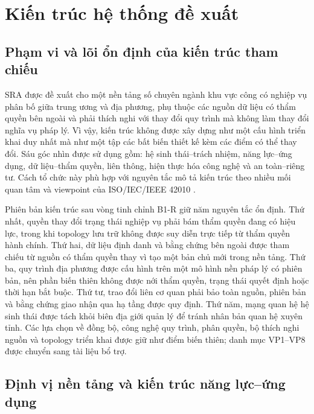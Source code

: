 \section{Kiến trúc hệ thống đề xuất}
\label{sec:arch}

\subsection{Phạm vi và lõi ổn định của kiến trúc tham chiếu}
\label{subsec:scope-viewpoints}

SRA được đề xuất cho một nền tảng số chuyên ngành khu vực công có nghiệp vụ phân bố giữa trung ương và địa phương, phụ thuộc các nguồn dữ liệu có thẩm quyền bên ngoài và phải thích nghi với thay đổi quy trình mà không làm thay đổi nghĩa vụ pháp lý. Vì vậy, kiến trúc không được xây dựng như một cấu hình triển khai duy nhất mà như một tập các bất biến thiết kế kèm các điểm có thể thay đổi. Sáu góc nhìn được sử dụng gồm: hệ sinh thái--trách nhiệm, năng lực--ứng dụng, dữ liệu--thẩm quyền, liên thông, hiện thực hóa công nghệ và an toàn--riêng tư. Cách tổ chức này phù hợp với nguyên tắc mô tả kiến trúc theo nhiều mối quan tâm và viewpoint của ISO/IEC/IEEE 42010 \citep{iso42010_2022}.

Phiên bản kiến trúc sau vòng tinh chỉnh B1-R giữ năm nguyên tắc ổn định. Thứ nhất, quyền thay đổi trạng thái nghiệp vụ phải bám thẩm quyền đang có hiệu lực, trong khi topology lưu trữ không được suy diễn trực tiếp từ thẩm quyền hành chính. Thứ hai, dữ liệu định danh và bằng chứng bên ngoài được tham chiếu từ nguồn có thẩm quyền thay vì tạo một bản chủ mới trong nền tảng. Thứ ba, quy trình địa phương được cấu hình trên một mô hình nền pháp lý có phiên bản, nên phần biến thiên không được nới thẩm quyền, trạng thái quyết định hoặc thời hạn bắt buộc. Thứ tư, trao đổi liên cơ quan phải bảo toàn nguồn, phiên bản và bằng chứng giao nhận qua hạ tầng được quy định. Thứ năm, mạng quan hệ hệ sinh thái được tách khỏi biên địa giới quản lý để tránh nhân bản quan hệ xuyên tỉnh. Các lựa chọn về đồng bộ, công nghệ quy trình, phân quyền, bộ thích nghi nguồn và topology triển khai được giữ như điểm biến thiên; danh mục VP1--VP8 được chuyển sang tài liệu bổ trợ.

\subsection{Định vị nền tảng và kiến trúc năng lực--ứng dụng}
\label{subsec:phanlop}

